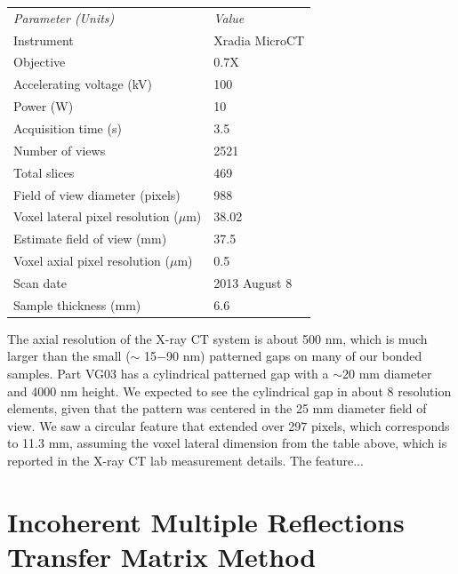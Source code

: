 \documentclass[osajnl,preprint,showpacs,superscriptaddress,12pt]{revtex4-1} %
\begin{document}
\begin{center}
    \begin{tabular}{ll}
    \emph{Parameter (Units)} & \emph{Value} \\ 
    Instrument& Xradia MicroCT \\
     Objective & 0.7X \\
    Accelerating voltage (kV) & 100 \\
        Power (W) & 10 \\
        Acquisition time (s) & 3.5 \\
        Number of views & 2521 \\
        Total slices & 469 \\
        Field of view diameter (pixels) & 988 \\
        Voxel lateral pixel resolution ($\mu$m) & 38.02 \\
        Estimate field of view (mm) & 37.5 \\
        Voxel axial pixel resolution ($\mu$m) & 0.5 \\
        Scan date & 2013 August 8 \\
        Sample thickness (mm) & 6.6 \\
     \end{tabular}
\end{center}

The axial resolution of the X-ray CT system is about 500 nm, which is much larger than the small ($\sim$ 15$-$90 nm) patterned gaps on many of our bonded samples.  Part VG03 has a cylindrical patterned gap with a $\sim$20 mm diameter and 4000 nm height.  We expected to see the cylindrical gap in about 8 resolution elements, given that the pattern was centered in the 25 mm diameter field of view.  We saw a circular feature that extended over 297 pixels, which corresponds to 11.3 mm, assuming the voxel lateral dimension from the table above, which is reported in the X-ray CT lab measurement details.  The feature...


\section{Incoherent Multiple Reflections Transfer Matrix Method}
\label{sec:Append-IMRTMM}
\end{document}
